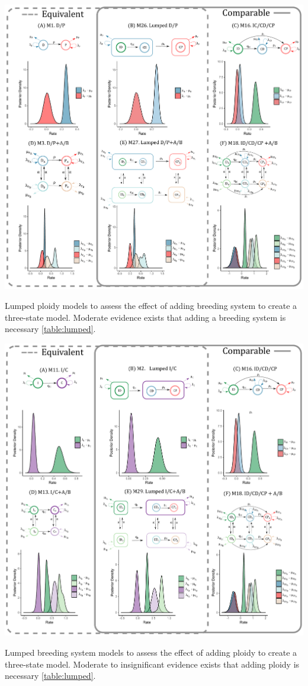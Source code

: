 \begin{suppfigure}
\includegraphics[width=\textwidth]{comparablesDP.pdf}
\caption{Lumped ploidy models to assess the effect of adding breeding system to create a three-state model. Moderate evidence exists that adding a breeding system is necessary \cref{table:lumped}. } %
\label{suppfigure:lumpedDP}
\end{suppfigure}

\begin{suppfigure}
\includegraphics[width=\textwidth]{comparablesIC.pdf}
\caption{Lumped breeding system models to assess the effect of adding ploidy to create a three-state model. Moderate to insignificant evidence exists that adding ploidy is necessary \cref{table:lumped}. } %
\label{suppfigure:lumpedIC}
\end{suppfigure}


